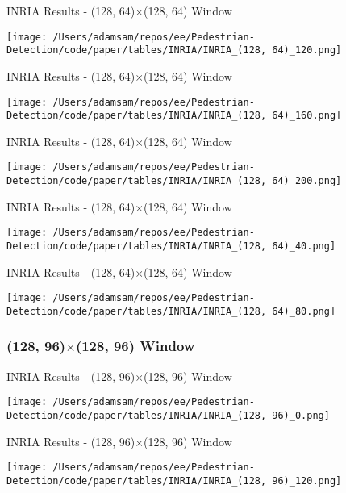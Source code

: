 \begin{table}
    \caption{INRIA Results - (128, 64)$\times$(128, 64) Window}
    \texttt{[image: /Users/adamsam/repos/ee/Pedestrian-Detection/code/paper/tables/INRIA/INRIA\_(128, 64)\_120.png]}
    \label{tab:INRIA_(128, 64)_120}
\end{table}

\begin{table}
    \caption{INRIA Results - (128, 64)$\times$(128, 64) Window}
    \texttt{[image: /Users/adamsam/repos/ee/Pedestrian-Detection/code/paper/tables/INRIA/INRIA\_(128, 64)\_160.png]}
    \label{tab:INRIA_(128, 64)_160}
\end{table}

\begin{table}
    \caption{INRIA Results - (128, 64)$\times$(128, 64) Window}
    \texttt{[image: /Users/adamsam/repos/ee/Pedestrian-Detection/code/paper/tables/INRIA/INRIA\_(128, 64)\_200.png]}
    \label{tab:INRIA_(128, 64)_200}
\end{table}

\begin{table}
    \caption{INRIA Results - (128, 64)$\times$(128, 64) Window}
    \texttt{[image: /Users/adamsam/repos/ee/Pedestrian-Detection/code/paper/tables/INRIA/INRIA\_(128, 64)\_40.png]}
    \label{tab:INRIA_(128, 64)_40}
\end{table}

\begin{table}
    \caption{INRIA Results - (128, 64)$\times$(128, 64) Window}
    \texttt{[image: /Users/adamsam/repos/ee/Pedestrian-Detection/code/paper/tables/INRIA/INRIA\_(128, 64)\_80.png]}
    \label{tab:INRIA_(128, 64)_80}
\end{table}

\subsubsection*{(128, 96)$\times$(128, 96) Window}

\begin{table}
    \caption{INRIA Results - (128, 96)$\times$(128, 96) Window}
    \texttt{[image: /Users/adamsam/repos/ee/Pedestrian-Detection/code/paper/tables/INRIA/INRIA\_(128, 96)\_0.png]}
    \label{tab:INRIA_(128, 96)_0}
\end{table}

\begin{table}
    \caption{INRIA Results - (128, 96)$\times$(128, 96) Window}
    \texttt{[image: /Users/adamsam/repos/ee/Pedestrian-Detection/code/paper/tables/INRIA/INRIA\_(128, 96)\_120.png]}
    \label{tab:INRIA_(128, 96)_120}
\end{table}

